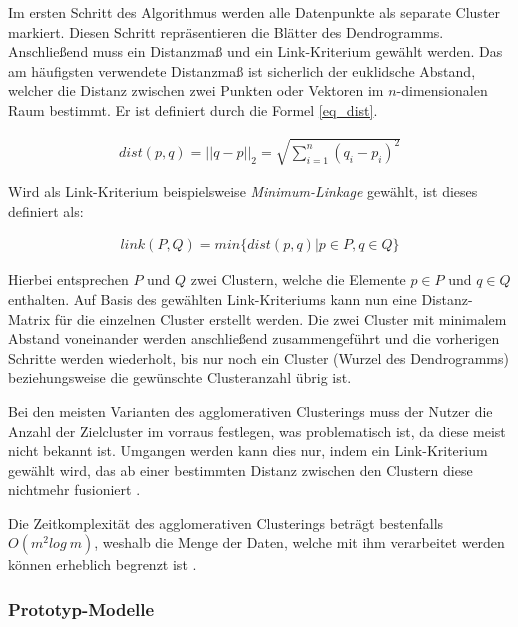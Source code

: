 Im ersten Schritt des Algorithmus werden alle Datenpunkte als separate Cluster markiert. Diesen Schritt
repräsentieren die Blätter des Dendrogramms.
Anschließend muss ein Distanzmaß und ein Link-Kriterium gewählt werden.
Das am häufigsten verwendete Distanzmaß ist sicherlich der euklidsche Abstand, welcher die Distanz zwischen zwei Punkten
oder Vektoren im $n$-dimensionalen Raum bestimmt. Er ist definiert durch die Formel \ref{eq_dist}.

\begin{ceqn}
\begin{align}
\label{eq_dist}
    dist(p,q) = ||q-p||_2 = \sqrt{\sum_{i=1}^n (q_i-p_i)^2}
\end{align}
\end{ceqn}

Wird als Link-Kriterium beispielsweise \textit{Minimum-Linkage} gewählt, ist dieses definiert als:

\begin{ceqn}
\begin{align}
\label{eq_linkage}
    link(P, Q) = min\{ dist(p,q) | p \in P, q \in Q\}
\end{align}
\end{ceqn}

Hierbei entsprechen $P$ und $Q$ zwei Clustern, welche die Elemente $p \in P$ und $q \in Q$ enthalten.
Auf Basis des gewählten Link-Kriteriums kann nun eine Distanz-Matrix für die einzelnen Cluster
erstellt werden.
Die zwei Cluster mit minimalem Abstand voneinander werden anschließend zusammengeführt und die
vorherigen Schritte werden wiederholt, bis nur noch ein Cluster (Wurzel des Dendrogramms) beziehungsweise
die gewünschte Clusteranzahl übrig ist. \cite[]{GeorgeSeif2018, tan2007introduction}

Bei den meisten Varianten des agglomerativen Clusterings muss der Nutzer die Anzahl der Zielcluster im
vorraus festlegen, was problematisch ist, da diese meist nicht bekannt ist. Umgangen werden kann dies nur,
indem ein Link-Kriterium gewählt wird, das ab einer bestimmten Distanz zwischen den Clustern diese nichtmehr
fusioniert \cite[]{GeorgeSeif2018}.

Die Zeitkomplexität des agglomerativen Clusterings beträgt bestenfalls $O(m^2log\ m)$, weshalb die Menge der Daten,
welche mit ihm verarbeitet werden können erheblich begrenzt ist \cite[]{tan2007introduction}.

\subsubsection{Prototyp-Modelle}
\label{sec:grund_prototype_clustering}

